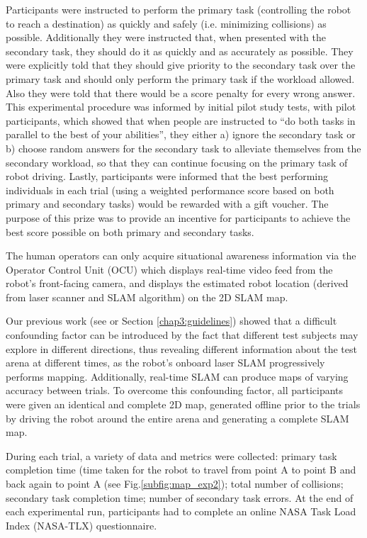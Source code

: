 \documentclass[a4paper,12pt,oneside,openright]{bhamthesis}
\begin{document}
Participants were instructed to perform the primary task (controlling the robot to reach a destination) as quickly and safely (i.e. minimizing collisions) as possible. Additionally they were instructed that, when presented with the secondary task, they should do it as quickly and as accurately as possible. They were explicitly told that they should give priority to the secondary task over the primary task and should only perform the primary task if the workload allowed. Also they were told that there would be a score penalty for every wrong answer. This experimental procedure was informed by initial pilot study tests, with pilot participants, which showed that when people are instructed to ``do both tasks in parallel to the best of your abilities'', they  either a) ignore the secondary task or b) choose random answers for the secondary task to alleviate themselves from the secondary workload, so that they can continue focusing on the primary task of robot driving. Lastly, participants were informed that the best performing individuals in each trial (using a weighted performance score based on both primary and secondary tasks) would be rewarded with a gift voucher. The purpose of this prize was to provide an incentive for participants to achieve the best score possible on both primary and secondary tasks.

The human operators can only acquire situational awareness information via the Operator Control Unit (OCU) which displays real-time video feed from the robot's front-facing camera, and displays the estimated robot location (derived from laser scanner and SLAM algorithm) on the 2D SLAM map.

Our previous work (see \citep{Chiou2015} or Section \ref{chap3:guidelines}) showed that a difficult confounding factor can be introduced by the fact that different test subjects may explore in different directions, thus revealing different information about the test arena at different times, as the robot's onboard laser SLAM progressively performs mapping. Additionally, real-time SLAM can produce maps of varying accuracy between trials. To overcome this confounding factor, all participants were given an identical and complete 2D map, generated offline prior to the trials by driving the robot around the entire arena and generating a complete SLAM map.

During each trial, a variety of data and metrics were collected: primary task completion time (time taken for the robot to travel from point A to point B and back again to point A (see Fig.\ref{subfig:map_exp2}); total number of collisions; secondary task completion time; number of secondary task errors. At the end of each experimental run, participants had to complete an online NASA Task Load Index (NASA-TLX) \citep{Sharek2011}  questionnaire. 
\end{document}
